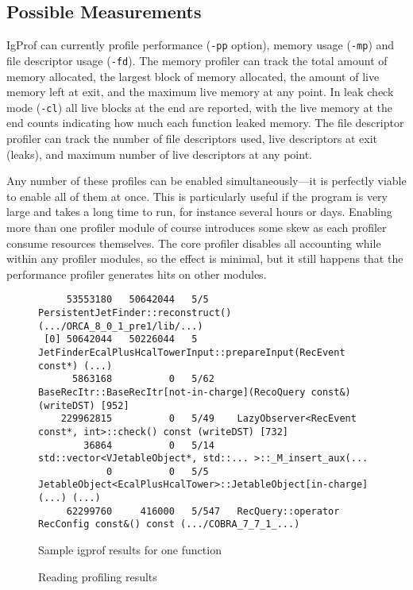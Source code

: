 \documentclass[10pt,a4paper,twocolumn]{article}
\begin{document}
\subsection{Possible Measurements}

IgProf can currently profile performance (\verb|-pp| option), memory
usage (\verb|-mp|) and file descriptor usage (\verb|-fd|).  The memory
profiler can track the total amount of memory allocated, the largest
block of memory allocated, the amount of live memory left at exit, and
the maximum live memory at any point.  In leak check mode (\verb|-cl|)
all live blocks at the end are reported, with the live memory at the
end counts indicating how much each function leaked memory.  The file
descriptor profiler can track the number of file descriptors used,
live descriptors at exit (leaks), and maximum number of live
descriptors at any point.

Any number of these profiles can be enabled simultaneously---it is
perfectly viable to enable all of them at once.  This is particularly
useful if the program is very large and takes a long time to run, for
instance several hours or days.  Enabling more than one profiler
module of course introduces some skew as each profiler consume
resources themselves.  The core profiler disables all accounting while
within any profiler modules, so the effect is minimal, but it still
happens that the performance profiler generates hits on other modules.

\begin{figure*}[!htbp]
{\small
\begin{verbatim}
     53553180   50642044   5/5     PersistentJetFinder::reconstruct() (.../ORCA_8_0_1_pre1/lib/...)
 [0] 50642044   50226044   5     JetFinderEcalPlusHcalTowerInput::prepareInput(RecEvent const*) (...)
      5863168          0   5/62    BaseRecItr::BaseRecItr[not-in-charge](RecoQuery const&) (writeDST) [952]
    229962815          0   5/49    LazyObserver<RecEvent const*, int>::check() const (writeDST) [732]
        36864          0   5/14    std::vector<VJetableObject*, std::... >::_M_insert_aux(...
            0          0   5/5     JetableObject<EcalPlusHcalTower>::JetableObject[in-charge](...) (...)
     62299760     416000   5/547   RecQuery::operator RecConfig const&() const (.../COBRA_7_7_1_...)
\end{verbatim}}
\caption{Sample igprof results for one function}
\end{figure*}

\begin{figure}[!htbp]
\begin{center}
  \mbox{}
  \caption{Reading profiling results}\label{fig:result}
\end{center}
\end{figure}
\end{document}
